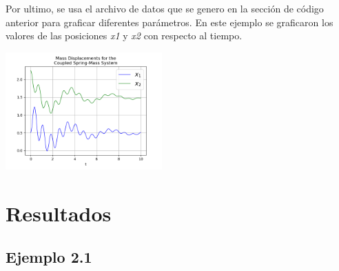 \documentclass{article}
\begin{document}
Por ultimo, se usa el archivo de datos que se genero en la sección de código anterior para graficar diferentes parámetros. En este ejemplo se graficaron los valores de las posiciones \textit{x1} y \textit{x2} con respecto al tiempo.

\begin{center}
	\includegraphics[width=6cm]{two_springs.png}
 
\end{center}
\vspace{0.3cm}

\section{Resultados}

\subsection*{Ejemplo 2.1}
\end{document}
